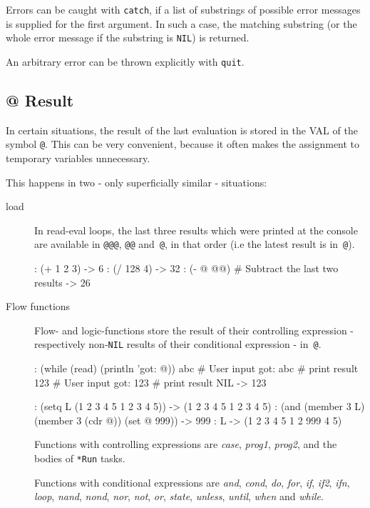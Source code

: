 Errors can be caught with \texttt{catch}, if a list of substrings of possible
error messages is supplied for the first argument. In such a case, the
matching substring (or the whole error message if the substring is
\texttt{NIL}) is returned.

An arbitrary error can be thrown explicitly with \texttt{quit}.

 

 
\subsection{@ Result}
\label{sec:refm-@-result}


In certain situations, the result of the last evaluation is stored in
the VAL of the symbol \texttt{@}. This can be very convenient, because it often
makes the assignment to temporary variables unnecessary.

This happens in two - only superficially similar - situations:

\begin{description}
\item[load] In read-eval loops, the last three results which were
  printed at the console are available in \texttt{@@@}, \texttt{@@}
  and~\texttt{@}, in that order (i.e the latest result is
  in~\texttt{@}).

\begin{wideverbatim}
: (+ 1 2 3)
-> 6
: (/ 128 4)
-> 32
: (- @ @@)        # Subtract the last two results
-> 26
\end{wideverbatim}

\item[Flow functions] Flow- and logic-functions store the result of
  their controlling expression - respectively non-\texttt{NIL} results
  of their conditional expression - in~\texttt{@}.

\begin{wideverbatim}
: (while (read) (println 'got: @))
abc            # User input
got: abc       # print result
123            # User input
got: 123       # print result
NIL
-> 123

: (setq L (1 2 3 4 5 1 2 3 4 5))
-> (1 2 3 4 5 1 2 3 4 5)
: (and (member 3 L) (member 3 (cdr @)) (set @ 999))
-> 999
: L
-> (1 2 3 4 5 1 2 999 4 5)
\end{wideverbatim}

Functions with controlling expressions are \emph{case},
\emph{prog1}, \emph{prog2}, and the bodies
of \texttt{*Run} tasks.

Functions with conditional expressions are \emph{and},
\emph{cond}, \emph{do}, \emph{for},
\emph{if}, \emph{if2}, \emph{ifn},
\emph{loop}, \emph{nand},
\emph{nond}, \emph{nor},
\emph{not}, \emph{or},
\emph{state}, \emph{unless},
\emph{until}, \emph{when} and
\emph{while}.

\end{description}

